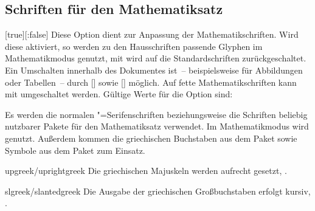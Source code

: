 \begin{Declaration*}{}
\begin{Declaration*}{}
\begin{Declaration*}{}
\subsection{Schriften für den Mathematiksatz}
%
%
%
%
\begin{Declaration}[v2.03]{}%
  [true][:false]
\printdeclarationlist%
%
Diese Option dient zur Anpassung der Mathematikschriften. Wird diese aktiviert, 
so werden zu den Hausschriften passende Glyphen im Mathematikmodus genutzt, 
mit  wird auf die Standardschriften zurückgeschaltet. Ein 
Umschalten innerhalb des Dokumentes ist~-- beispielsweise für Abbildungen oder 
Tabellen~-- durch [] sowie 
[] möglich. Auf fette 
Mathematikschriften kann mit  umgeschaltet werden. Gültige 
Werte für die Option  sind:
%
\begin{values}{}
\itemfalse
  Es werden die normalen "=Serifenschriften beziehungsweise die 
  Schriften beliebig nutzbarer Pakete für den Mathematiksatz verwendet.
\itemtrue*
  Im Mathematikmodus wird \Univers genutzt. Außerdem kommen die griechischen 
  Buchstaben aus dem Paket  sowie Symbole aus dem Paket 
   zum Einsatz.
\item[upgreek/uprightgreek]
  Die griechischen Majuskeln werden aufrecht gesetzt, 
  .
\item[slgreek/slantedgreek]
  Die Ausgabe der griechischen Großbuchstaben erfolgt kursiv, 
  .
\end{values}
\end{Declaration}



\end{Declaration*}
\end{Declaration*}
\end{Declaration*}
